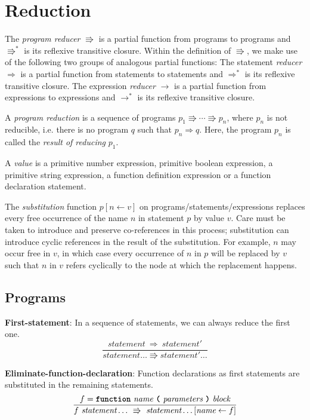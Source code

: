 \section*{Reduction}

The 
\emph{program reducer} $\Rrightarrow$ is a partial function from
programs to
programs
and $\Rrightarrow^*$ is its reflexive transitive closure.
Within the definition of $\Rrightarrow$, we make use of
the following two groups of analogous partial functions:
The statement
\emph{reducer} $\Rightarrow$ is a partial function from
statements to statements
and $\Rightarrow^*$ is its reflexive transitive closure.
The expression
\emph{reducer} $\rightarrow$ is a partial function from
expressions to expressions
and $\rightarrow^*$ is its reflexive transitive closure.

A \emph{program reduction} is a sequence of programs
$p_1 \Rrightarrow \cdots \Rrightarrow p_n$,
where $p_n$ is not reducible, i.e. there is no
program $q$ such that $p_n \Rightarrow q$.
Here, the program $p_n$ is called the \emph{result
of reducing} $p_1$.

A \emph{value} is a primitive number expression,
primitive boolean expression,
a primitive string expression, a function definition
expression or a function declaration statement.

The \emph{substitution} function 
$p [ n \leftarrow v ]$ on programs/statements/expressions
replaces every free occurrence of the name $n$
in statement $p$ by value $v$. Care must be taken to introduce
and preserve
co-references in this process; substitution can introduce
cyclic references in the result of the substitution. For example,
$n$ may occur free in $v$, in which case
every occurrence of $n$ in $p$
will be replaced by $v$ such that $n$ in $v$ refers cyclically
to the node at which the replacement happens.

\subsection*{Programs}


\textbf{First-statement}: In a sequence of statements, we can always
reduce the first one.
\[
\frac{
  \textit{statement}\ \Rightarrow\ \textit{statement}'
}{  
  \textit{statement} \ldots
  \Rrightarrow 
  \textit{statement}' \ldots
}
\]

\vspace{10mm}

\textbf{Eliminate-function-declaration}: Function declarations as first
statements are substituted in the remaining statements.
\[
\frac{
             f = \textbf{\texttt{function}}\  \textit{name} \ 
                 \textbf{\texttt{(}}\  \textit{parameters}
                 \ \textbf{\texttt{)}}\ \textit{block}
}{
f\ \textit{statement} \ldots\ 
  \Rrightarrow\ 
  \textit{statement} \ldots[\textit{name} \leftarrow f]
}
\]

